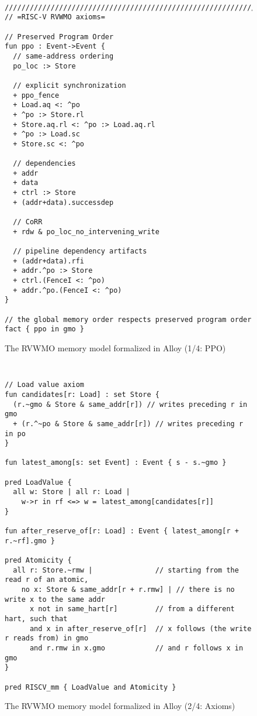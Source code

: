 \begin{figure}[h!]
  {
  \tt\bfseries\centering\footnotesize
  \begin{lstlisting}
////////////////////////////////////////////////////////////////////////////////
// =RISC-V RVWMO axioms=

// Preserved Program Order
fun ppo : Event->Event {
  // same-address ordering
  po_loc :> Store

  // explicit synchronization
  + ppo_fence
  + Load.aq <: ^po
  + ^po :> Store.rl
  + Store.aq.rl <: ^po :> Load.aq.rl
  + ^po :> Load.sc
  + Store.sc <: ^po

  // dependencies
  + addr
  + data
  + ctrl :> Store
  + (addr+data).successdep

  // CoRR
  + rdw & po_loc_no_intervening_write

  // pipeline dependency artifacts
  + (addr+data).rfi
  + addr.^po :> Store
  + ctrl.(FenceI <: ^po)
  + addr.^po.(FenceI <: ^po)
}

// the global memory order respects preserved program order
fact { ppo in gmo }
\end{lstlisting}}
  \caption{The RVWMO memory model formalized in Alloy (1/4: PPO)}
  \label{fig:alloy1}
\end{figure}
\begin{figure}[h!]
  {
  \tt\bfseries\centering\footnotesize
  \begin{lstlisting}
// Load value axiom
fun candidates[r: Load] : set Store {
  (r.~gmo & Store & same_addr[r]) // writes preceding r in gmo
  + (r.^~po & Store & same_addr[r]) // writes preceding r in po
}

fun latest_among[s: set Event] : Event { s - s.~gmo }

pred LoadValue {
  all w: Store | all r: Load |
    w->r in rf <=> w = latest_among[candidates[r]]
}

fun after_reserve_of[r: Load] : Event { latest_among[r + r.~rf].gmo }

pred Atomicity {
  all r: Store.~rmw |               // starting from the read r of an atomic,
    no x: Store & same_addr[r + r.rmw] | // there is no write x to the same addr
      x not in same_hart[r]         // from a different hart, such that
      and x in after_reserve_of[r]  // x follows (the write r reads from) in gmo
      and r.rmw in x.gmo            // and r follows x in gmo
}

pred RISCV_mm { LoadValue and Atomicity }
\end{lstlisting}}
  \caption{The RVWMO memory model formalized in Alloy (2/4: Axioms)}
  \label{fig:alloy2}
\end{figure}
